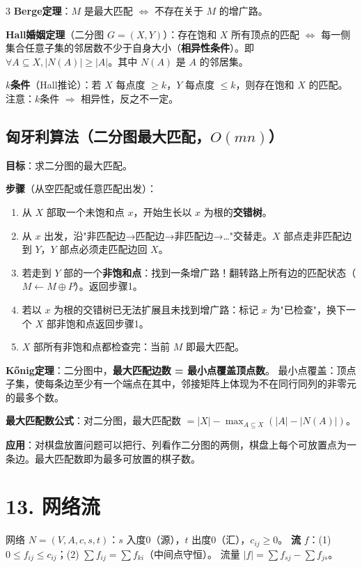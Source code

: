 \documentclass[10pt,a4paper,landscape]{ctexart}
\begin{document}
\begin{multicols}{3}
\textbf{Berge定理}：$M$ 是最大匹配 $\iff$ 不存在关于 $M$ 的增广路。

\textbf{Hall婚姻定理}（二分图 $G=(X,Y)$）：存在饱和 $X$ 所有顶点的匹配 $\iff$ 每一侧集合任意子集的邻居数不少于自身大小（\textbf{相异性条件}）。即 $\forall A\subseteq X,|N(A)|\geq|A|$。其中 $N(A)$ 是 $A$ 的邻居集。

\textbf{$k$条件}（Hall推论）：若 $X$ 每点度 $\geq k$，$Y$ 每点度 $\leq k$，则存在饱和 $X$ 的匹配。注意：$k$条件 $\Rightarrow$ 相异性，反之不一定。

\subsection*{匈牙利算法（二分图最大匹配，$O(mn)$）}

\textbf{目标}：求二分图的最大匹配。

\textbf{步骤}（从空匹配或任意匹配出发）：
\begin{enumerate}[nosep,leftmargin=*]
\item 从 $X$ 部取一个未饱和点 $x$，开始生长以 $x$ 为根的\textbf{交错树}。
\item 从 $x$ 出发，沿"非匹配边→匹配边→非匹配边→…"交替走。$X$ 部点走非匹配边到 $Y$，$Y$ 部点必须走匹配边回 $X$。
\item 若走到 $Y$ 部的一个\textbf{非饱和点}：找到一条增广路！翻转路上所有边的匹配状态（$M\leftarrow M\oplus P$）。返回步骤1。
\item 若以 $x$ 为根的交错树已无法扩展且未找到增广路：标记 $x$ 为"已检查"，换下一个 $X$ 部非饱和点返回步骤1。
\item $X$ 部所有非饱和点都检查完：当前 $M$ 即最大匹配。
\end{enumerate}

\textbf{Kőnig定理}：二分图中，\textbf{最大匹配边数 = 最小点覆盖顶点数}。
最小点覆盖：顶点子集，使每条边至少有一个端点在其中，邻接矩阵上体现为不在同行同列的非零元的最多个数。

\textbf{最大匹配数公式}：对二分图，最大匹配数 $=|X|-\max_{A\subseteq X}(|A|-|N(A)|)$。

\textbf{应用}：对棋盘放置问题可以把行、列看作二分图的两侧，棋盘上每个可放置点为一条边。最大匹配数即为最多可放置的棋子数。

\section*{13. 网络流}

网络 $N=(V,A,c,s,t)$：$s$ 入度0（源），$t$ 出度0（汇），$c_{ij}\geq 0$。
\textbf{流} $f$：(1) $0\leq f_{ij}\leq c_{ij}$；(2) $\sum f_{ij}=\sum f_{ki}$（中间点守恒）。
流量 $|f|=\sum f_{sj}-\sum f_{js}$。


\end{multicols}
\end{document}
